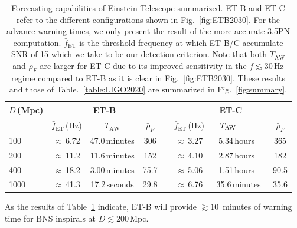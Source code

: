 \documentclass[prd,amsmath,amssymb,aps,floats,amsfonts,notitlepage,superscriptaddress,eqsecnum,nofootinbib,10pt]{revtex4-1}
\newcommand\T{\rule{0pt}{2.6ex}}       %
\newcommand\B{\rule[-1.2ex]{0pt}{0pt}} %
\begin{document}
\begin{table}[h]
\centering
\begin{tabular}{l|ccccccc}
\hline
$D\,$(Mpc) & \multicolumn{3}{c}{ET-B} &  & \multicolumn{3}{c}{ET-C}\T\B\\
\hline
{}& $\bar{f}_\text{ET}\,$(Hz) & \ \hspace{7mm} $T_\text{AW}$ \ \hspace{7mm} & $\bar{\rho}_{F}$ &{} & $\bar{f}_\text{ET}\,$(Hz) & \ \hspace{5mm} $T_\text{AW}\hspace{12mm}$& $\bar{\rho}_{F}$\T\B\\
100 & $\approx\,$6.72 &  47.0\,minutes & 306 &{\qquad} & $\approx\,$3.27 & 5.34\,hours\ & 365\T\\
200 & $\approx\,$11.2 & 11.6\,minutes & 152 &{\qquad} & $\approx\,$4.10 & 2.87\,hours\ & 182 \\
400 & $\approx\,$18.2 & 3.00\,minutes & 75.7 &{\qquad} & $\approx\,$5.06 & 1.51\,hours\ & 90.5\\
1000 & $\approx\,$41.3 &17.2\,seconds & 29.8& \qquad &    $\approx\,$6.76 & 35.6\,minutes & 35.6  \\
\hline
\end{tabular}
\caption{Forecasting capabilities of Einstein Telescope summarized. 
ET-B and ET-C refer to the different configurations shown in Fig.~\ref{fig:ETB2030}. For the advance warning times, we only present the result of the more accurate 3.5PN computation. $\bar{f}_\text{ET}$ is the threshold frequency at which
ET-B/C accumulate SNR of 15 which we take to be our detection criterion. Note that both $T_\text{AW}$ and $\bar\rho_F$ are larger for ET-C
due to its improved sensitivity in the $f\lesssim 30\,$Hz regime compared to ET-B as it is clear in Fig.~\ref{fig:ETB2030}.
These results and those of Table.~\ref{table:LIGO2020} are summarized in Fig.~\ref{fig:summary}.}\label{table:ET}
\end{table}
%
%
As the results of Table~\ref{table:ET} indicate, ET-B will provide $\gtrsim 10\,$ minutes of warning time for BNS inspirals at $D\lesssim 200\,$Mpc.
\end{document}
